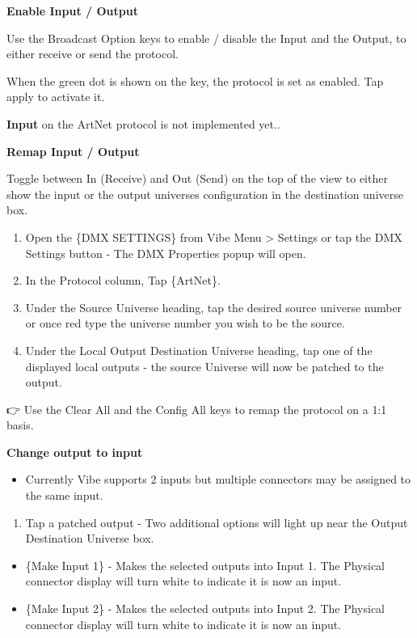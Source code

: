 \documentclass[
]{article}
\providecommand{\tightlist}{%
  \setlength{\itemsep}{0pt}\setlength{\parskip}{0pt}}
\begin{document}
\textbf{Enable Input / Output}

Use the Broadcast Option keys to enable / disable the Input and the Output, to either receive or send the protocol.

When the green dot is shown on the key, the protocol is set as enabled. Tap apply to activate it.

{\textbf{Input} on the ArtNet protocol is not implemented yet.}.

\textbf{Remap Input / Output}

Toggle between In (Receive) and Out (Send) on the top of the view to either show the input or the output universes configuration in the destination universe box.

\begin{enumerate}
\def\labelenumi{\arabic{enumi}.}
\item
  Open the \{DMX SETTINGS\} from Vibe Menu \textgreater{} Settings or tap the DMX Settings button - The DMX Properties popup will open.
\item
  In the Protocol column, Tap \{ArtNet\}.
\item
  Under the Source Universe heading, tap the desired source universe number or once red type the universe number you wish to be the source.
\item
  Under the Local Output Destination Universe heading, tap one of the displayed local outputs - the source Universe will now be patched to the output.
\end{enumerate}

👉 Use the Clear All and the Config All keys to remap the protocol on a 1:1 basis.

\textbf{Change output to input}

\begin{itemize}
\tightlist
\item
  Currently Vibe supports 2 inputs but multiple connectors may be assigned to the same input.
\end{itemize}

\begin{enumerate}
\def\labelenumi{\arabic{enumi}.}
\tightlist
\item
  Tap a patched output - Two additional options will light up near the Output Destination Universe box.
\end{enumerate}

\begin{itemize}
\item
  \{Make Input 1\} - Makes the selected outputs into Input 1. The Physical connector display will turn white to indicate it is now an input.
\item
  \{Make Input 2\} - Makes the selected outputs into Input 2. The Physical connector display will turn white to indicate it is now an input.
\end{itemize}
\end{document}
